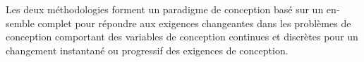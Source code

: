 \documentclass[12pt,Bold,letterpaper,TexShade,twoside]{mcgilletdclass}
\begin{document}
\begin{romanPagenumber}{2}
\begin{otherlanguage}{french}
{Les deux méthodologies forment un paradigme de conception basé sur un ensemble complet pour répondre aux exigences changeantes dans les problèmes de conception comportant des variables de conception continues et discrètes pour un changement instantané ou progressif des exigences de conception.}%
\AbstractFr%
\end{otherlanguage}
%
%
%
\tableofcontents %
\listoftables %
\listoffigures %

\end{romanPagenumber}


















% 

%
\end{document}
